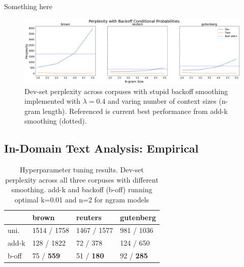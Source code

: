 \documentclass[11pt,a4paper]{article}
\begin{document}
Something here

\begin{figure}[htpb]
  \centering
  \includegraphics[width=1\linewidth]{imgs/backoff.png}
  \caption{Dev-set perplexity across corpuses with stupid backoff
  smoothing implemented with $\lambda=0.4$ and varing number of
  context sizes (n-gram length). Referenced is current best 
performance from add-k smoothing (dotted).}
  \label{fig:backoff}
\end{figure}



\subsection{In-Domain Text Analysis: Empirical}%
\label{sec:in_domain_text_analysis_empirical}


\begin{table}
\begin{tabular}{llll}
\hline
         & brown       & reuters     & gutenberg   \\
\hline
 uni. & 1514 / 1758 & 1467 / 1577 & 981 / 1036  \\
 add-k   & 128 / 1822  & 72 / 378    & 124 / 650   \\
 b-off & 75 / \textbf{ 559 }    & 51 / \textbf{ 180 }    & 92 / \textbf{ 285 }    \\
\hline
\end{tabular}
\caption{Hyperparameter tuning results. Dev-set perplexity across
all three corpuses with different smoothing. add-k and backoff (b-off) 
running optimal k=0.01 and n=2 for ngram models}
\label{table:hyperparameter}
\end{table}
\end{document}
